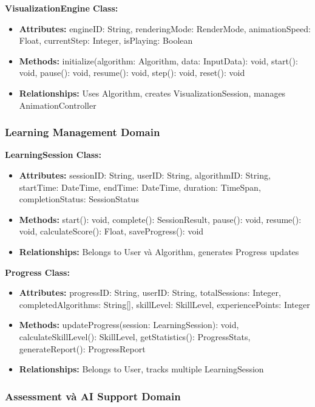 \textbf{VisualizationEngine Class:}
\begin{itemize}
    \item \textbf{Attributes:} engineID: String, renderingMode: RenderMode, animationSpeed: Float, currentStep: Integer, isPlaying: Boolean
    \item \textbf{Methods:} initialize(algorithm: Algorithm, data: InputData): void, start(): void, pause(): void, resume(): void, step(): void, reset(): void
    \item \textbf{Relationships:} Uses Algorithm, creates VisualizationSession, manages AnimationController
\end{itemize}

\subsubsection{Learning Management Domain}

\textbf{LearningSession Class:}
\begin{itemize}
    \item \textbf{Attributes:} sessionID: String, userID: String, algorithmID: String, startTime: DateTime, endTime: DateTime, duration: TimeSpan, completionStatus: SessionStatus
    \item \textbf{Methods:} start(): void, complete(): SessionResult, pause(): void, resume(): void, calculateScore(): Float, saveProgress(): void
    \item \textbf{Relationships:} Belongs to User và Algorithm, generates Progress updates
\end{itemize}

\textbf{Progress Class:}
\begin{itemize}
    \item \textbf{Attributes:} progressID: String, userID: String, totalSessions: Integer, completedAlgorithms: String[], skillLevel: SkillLevel, experiencePoints: Integer
    \item \textbf{Methods:} updateProgress(session: LearningSession): void, calculateSkillLevel(): SkillLevel, getStatistics(): ProgressStats, generateReport(): ProgressReport
    \item \textbf{Relationships:} Belongs to User, tracks multiple LearningSession
\end{itemize}

\subsubsection{Assessment và AI Support Domain}

